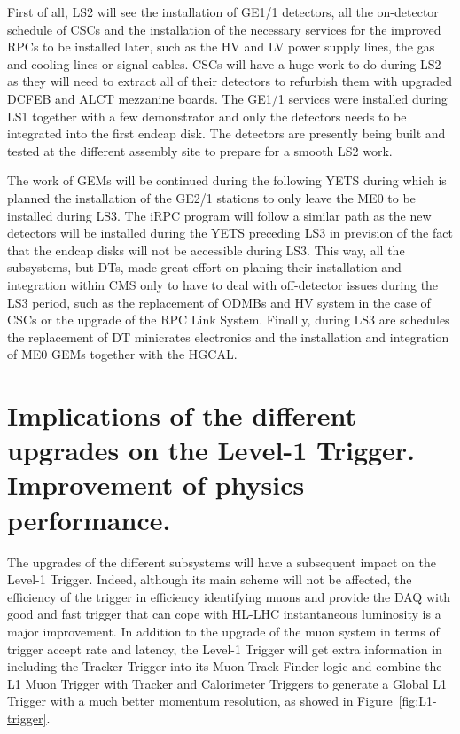 	First of all, LS2 will see the installation of GE1/1 detectors, all the on-detector schedule of CSCs and the installation of the necessary services for the improved RPCs to be installed later, such as the HV and LV power supply lines, the gas and cooling lines or signal cables. CSCs will have a huge work to do during LS2 as they will need to extract all of their detectors to refurbish them with upgraded DCFEB and ALCT mezzanine boards. The GE1/1 services were installed during LS1 together with a few demonstrator and only the detectors needs to be integrated into the first endcap disk. The detectors are presently being built and tested at the different assembly site to prepare for a smooth LS2 work.
	
	The work of GEMs will be continued during the following YETS during which is planned the installation of the GE2/1 stations to only leave the ME0 to be installed during LS3. The iRPC program will follow a similar path as the new detectors will be installed during the YETS preceding LS3 in prevision of the fact that the endcap disks will not be accessible during LS3. This way, all the subsystems, but DTs, made great effort on planing their installation and integration within CMS only to have to deal with off-detector issues during the LS3 period, such as the replacement of ODMBs and HV system in the case of CSCs or the upgrade of the RPC Link System. Finallly, during LS3 are schedules the replacement of DT minicrates electronics and the installation and integration of ME0 GEMs together with the HGCAL.
	
\section{Implications of the different upgrades on the Level-1 Trigger. Improvement of physics performance.}
\label{chapt3:sec:L1tP2}

	The upgrades of the different subsystems will have a subsequent impact on the Level-1 Trigger. Indeed, although its main scheme will not be affected, the efficiency of the trigger in efficiency identifying muons and provide the DAQ with good and fast trigger that can cope with HL-LHC instantaneous luminosity is a major improvement. In addition to the upgrade of the muon system in terms of trigger accept rate and latency, the Level-1 Trigger will get extra information in including the Tracker Trigger into its Muon Track Finder logic and combine the L1 Muon Trigger with Tracker and Calorimeter Triggers to generate a Global L1 Trigger with a much better momentum resolution, as showed in Figure~\ref{fig:L1-trigger}.

